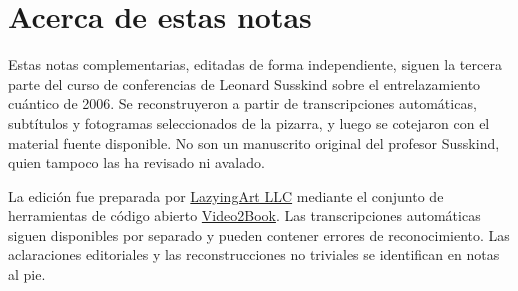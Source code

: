 \documentclass[11pt,oneside]{book}
\begin{document}
\frontmatter
\hypersetup{pageanchor=false}

\hypersetup{pageanchor=true}

\clearpage
\chapter{Acerca de estas notas}
Estas notas complementarias, editadas de forma independiente, siguen la tercera parte del curso de conferencias de Leonard Susskind sobre el entrelazamiento cuántico de 2006. Se reconstruyeron a partir de transcripciones automáticas, subtítulos y fotogramas seleccionados de la pizarra, y luego se cotejaron con el material fuente disponible. No son un manuscrito original del profesor Susskind, quien tampoco las ha revisado ni avalado.

La edición fue preparada por \href{https://lazying.art}{LazyingArt LLC} mediante el conjunto de herramientas de código abierto \href{https://github.com/lachlanchen/Video2Book}{Video2Book}. Las transcripciones automáticas siguen disponibles por separado y pueden contener errores de reconocimiento. Las aclaraciones editoriales y las reconstrucciones no triviales se identifican en notas al pie.
\clearpage
\tableofcontents
\mainmatter








\end{document}
